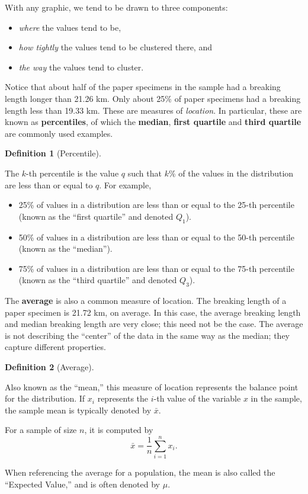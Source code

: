 \documentclass[
  letterpaper,
  DIV=11,
  numbers=noendperiod]{scrreprt}
\providecommand{\tightlist}{%
  \setlength{\itemsep}{0pt}\setlength{\parskip}{0pt}}\usepackage{longtable,booktabs,array}
\theoremstyle{definition}
\newtheorem{definition}{Definition}[chapter]
\theoremstyle{definition}
\theoremstyle{plain}
\theoremstyle{remark}
\begin{document}
With any graphic, we tend to be drawn to three components:

\begin{itemize}
\tightlist
\item
  \emph{where} the values tend to be,
\item
  \emph{how tightly} the values tend to be clustered there, and
\item
  \emph{the way} the values tend to cluster.
\end{itemize}

Notice that about half of the paper specimens in the sample had a
breaking length longer than 21.26 km. Only about 25\% of paper specimens
had a breaking length less than 19.33 km. These are measures of
\emph{location}. In particular, these are known as \textbf{percentiles},
of which the \textbf{median}, \textbf{first quartile} and \textbf{third
quartile} are commonly used examples.

\begin{definition}[Percentile]\protect\hypertarget{def-percentile}{}\label{def-percentile}

The \(k\)-th percentile is the value \(q\) such that \(k\)\% of the
values in the distribution are less than or equal to \(q\). For example,

\begin{itemize}
\tightlist
\item
  25\% of values in a distribution are less than or equal to the 25-th
  percentile (known as the ``first quartile'' and denoted \(Q_1\)).
\item
  50\% of values in a distribution are less than or equal to the 50-th
  percentile (known as the ``median'').
\item
  75\% of values in a distribution are less than or equal to the 75-th
  percentile (known as the ``third quartile'' and denoted \(Q_3\)).
\end{itemize}

\end{definition}

The \textbf{average} is also a common measure of location. The breaking
length of a paper specimen is 21.72 km, on average. In this case, the
average breaking length and median breaking length are very close; this
need not be the case. The average is not describing the ``center'' of
the data in the same way as the median; they capture different
properties.

\begin{definition}[Average]\protect\hypertarget{def-average}{}\label{def-average}

Also known as the ``mean,'' this measure of location represents the
balance point for the distribution. If \(x_i\) represents the \(i\)-th
value of the variable \(x\) in the sample, the sample mean is typically
denoted by \(\bar{x}\).

For a sample of size \(n\), it is computed by
\[\bar{x} = \frac{1}{n}\sum_{i=1}^{n} x_i.\]

When referencing the average for a population, the mean is also called
the ``Expected Value,'' and is often denoted by \(\mu\).

\end{definition}
\end{document}
